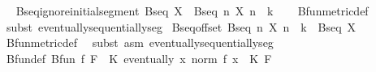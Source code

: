 \begin{isabellebody}
\isadelimproof
\ %
\endisadelimproof
%
\isatagproof
\isacommand{{\isachardot}{\kern0pt}{\isachardot}{\kern0pt}}\isamarkupfalse%
%
\endisatagproof
{\isafoldproof}%
%
\isadelimproof
%
\endisadelimproof
\isanewline
\isanewline
{}\isamarkupfalse%
\ Bseq{\isacharunderscore}{\kern0pt}ignore{\isacharunderscore}{\kern0pt}initial{\isacharunderscore}{\kern0pt}segment{\isacharcolon}{\kern0pt}\ {\isachardoublequoteopen}Bseq\ X\ {\isasymLongrightarrow}\ Bseq\ {\isacharparenleft}{\kern0pt}{\isasymlambda}n{\isachardot}{\kern0pt}\ X\ {\isacharparenleft}{\kern0pt}n\ {\isacharplus}{\kern0pt}\ k{\isacharparenright}{\kern0pt}{\isacharparenright}{\kern0pt}{\isachardoublequoteclose}\isanewline
%
\isadelimproof
\ \ %
\endisadelimproof
%
\isatagproof
{}\isamarkupfalse%
\ Bfun{\isacharunderscore}{\kern0pt}metric{\isacharunderscore}{\kern0pt}def\ \isamarkupfalse%
\ {\isacharparenleft}{\kern0pt}subst\ eventually{\isacharunderscore}{\kern0pt}sequentially{\isacharunderscore}{\kern0pt}seg{\isacharparenright}{\kern0pt}%
\endisatagproof
{\isafoldproof}%
%
\isadelimproof
\isanewline
%
\endisadelimproof
\isanewline
{}\isamarkupfalse%
\ Bseq{\isacharunderscore}{\kern0pt}offset{\isacharcolon}{\kern0pt}\ {\isachardoublequoteopen}Bseq\ {\isacharparenleft}{\kern0pt}{\isasymlambda}n{\isachardot}{\kern0pt}\ X\ {\isacharparenleft}{\kern0pt}n\ {\isacharplus}{\kern0pt}\ k{\isacharparenright}{\kern0pt}{\isacharparenright}{\kern0pt}\ {\isasymLongrightarrow}\ Bseq\ X{\isachardoublequoteclose}\isanewline
%
\isadelimproof
\ \ %
\endisadelimproof
%
\isatagproof
{}\isamarkupfalse%
\ Bfun{\isacharunderscore}{\kern0pt}metric{\isacharunderscore}{\kern0pt}def\ \isamarkupfalse%
\ {\isacharparenleft}{\kern0pt}subst\ {\isacharparenleft}{\kern0pt}asm{\isacharparenright}{\kern0pt}\ eventually{\isacharunderscore}{\kern0pt}sequentially{\isacharunderscore}{\kern0pt}seg{\isacharparenright}{\kern0pt}%
\endisatagproof
{\isafoldproof}%
%
\isadelimproof
\isanewline
%
\endisadelimproof
\isanewline
{}\isamarkupfalse%
\ Bfun{\isacharunderscore}{\kern0pt}def{\isacharcolon}{\kern0pt}\ {\isachardoublequoteopen}Bfun\ f\ F\ {\isasymlongleftrightarrow}\ {\isacharparenleft}{\kern0pt}{\isasymexists}K{\isachargreater}{\kern0pt}{}{\isachardot}{\kern0pt}\ eventually\ {\isacharparenleft}{\kern0pt}{\isasymlambda}x{\isachardot}{\kern0pt}\ norm\ {\isacharparenleft}{\kern0pt}f\ x{\isacharparenright}{\kern0pt}\ {\isasymle}\ K{\isacharparenright}{\kern0pt}\ F{\isacharparenright}{\kern0pt}{\isachardoublequoteclose}\isanewline

\end{isabellebody}
